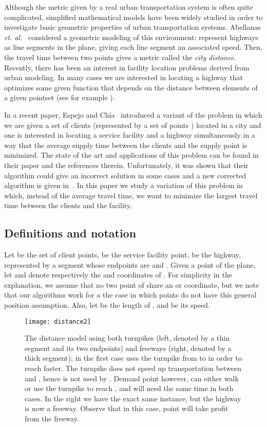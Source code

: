 \documentclass{llncs}
\begin{document}
Although the metric given by a real urban transportation system is often quite complicated, simplified mathematical models have been widely studied in order to investigate basic geometric properties of urban transportation systems. Abellanas {\em et. al.}~\cite{ahiklmps-vdsnh-03} considered a geometric modeling of this environment: represent highways as line segments in the plane, giving each line segment an associated speed. Then, the travel time between two points gives a metric called the {\em city distance}. Recently, there has been an interest in facility location problems derived from urban modeling. In many cases we are interested in locating a highway that optimizes some given function that depends on the distance between elements of a given pointset (see for example \cite{cardinal08,kt-oishcm-08}).

In a recent paper,  Espejo and Ch\'{i}a~\cite{espejo11} introduced a variant of the problem in which we are given a set of clients  (represented by a set of points ) located in a city and one is interested in locating a  service facility and a highway simultaneously in a way that the average supply time between the clients and the supply point is minimized.
The state of the art and applications of this problem can be found in their paper and the references therein.
Unfortunately, it was shown that their algorithm could give an incorrect solution in some cases and a new corrected algorithm is given in~\cite{bklv-lsfrtl-11}. In this paper we study a variation of this problem in which, instead of the average travel time, we want to minimize the largest travel time between the clients and the facility.







\subsection{Definitions and notation}
Let  be the set of  client points,  be the service facility point,  be the highway, represented by a segment whose endpoints are  and . Given a point  of the plane, let  and  denote respectively the  and  coordinates of . For simplicity in the explanation, we assume that no two point of  share an  or  coordinate, but we note that our algorithms work for a the case in which points do not have this general position assumption.  Also, let  be the length of , and  be its speed. 

\begin{figure}[h]
    \centering
    \texttt{[image: distance2]}
    \caption{\small{The distance model using both turnpikes (left, denoted by a thin segment and its two endpoints) and freeways (right, denoted by a thick segment); in the first case  uses the turnpike from  to  in order to reach  faster. The turnpike does not speed up transportation between  and , hence is not used by . Demand point  however, can either walk or use the turnpike to reach , and will need the same time in both cases. In the right we have the exact same instance, but the highway is now a freeway. Observe that in this case, point  will take profit from the freeway.}}
\label{fig:distance}
\end{figure}
\end{document}

